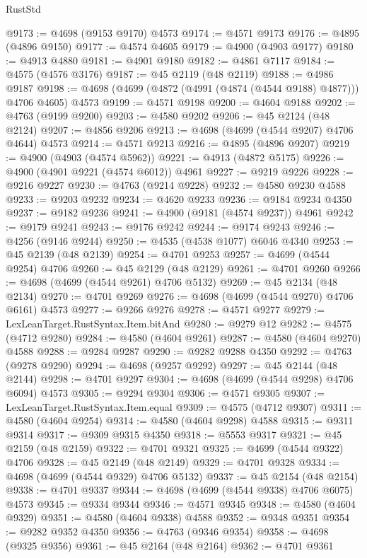 \begin{lexlean}{RustStd}
\begin{coremodule}
@9173 := @4698 (@9153 @9170) @4573
@9174 := @4571 @9173
@9176 := @4895 (@4896 @9150)
@9177 := @4574 @4605
@9179 := @4900 (@4903 @9177)
@9180 := @4913 @4880
@9181 := @4901 @9180
@9182 := @4861 @7117
@9184 := @4575 (@4576 @3176)
@9187 := @45 @2119 (@48 @2119)
@9188 := @4986 @9187
@9198 := @4698 (@4699 (@4872 (@4991 (@4874 (@4544 @9188) @4877))) @4706 @4605) @4573
@9199 := @4571 @9198
@9200 := @4604 @9188
@9202 := @4763 (@9199 @9200)
@9203 := @4580 @9202
@9206 := @45 @2124 (@48 @2124)
@9207 := @4856 @9206
@9213 := @4698 (@4699 (@4544 @9207) @4706 @4644) @4573
@9214 := @4571 @9213
@9216 := @4895 (@4896 @9207)
@9219 := @4900 (@4903 (@4574 @5962))
@9221 := @4913 (@4872 @5175)
@9226 := @4900 (@4901 @9221 (@4574 @6012)) @4961
@9227 := @9219 @9226
@9228 := @9216 @9227
@9230 := @4763 (@9214 @9228)
@9232 := @4580 @9230 @4588
@9233 := @9203 @9232
@9234 := @4620 @9233
@9236 := @9184 @9234 @4350
@9237 := @9182 @9236
@9241 := @4900 (@9181 (@4574 @9237)) @4961
@9242 := @9179 @9241
@9243 := @9176 @9242
@9244 := @9174 @9243
@9246 := @4256 (@9146 @9244)
@9250 := @4535 (@4538 @1077) @6046 @4340
@9253 := @45 @2139 (@48 @2139)
@9254 := @4701 @9253
@9257 := @4699 (@4544 @9254) @4706
@9260 := @45 @2129 (@48 @2129)
@9261 := @4701 @9260
@9266 := @4698 (@4699 (@4544 @9261) @4706 @5132)
@9269 := @45 @2134 (@48 @2134)
@9270 := @4701 @9269
@9276 := @4698 (@4699 (@4544 @9270) @4706 @6161) @4573
@9277 := @9266 @9276
@9278 := @4571 @9277
@9279 := LexLeanTarget.RustSyntax.Item.bitAnd
@9280 := @9279 @12
@9282 := @4575 (@4712 @9280)
@9284 := @4580 (@4604 @9261)
@9287 := @4580 (@4604 @9270) @4588
@9288 := @9284 @9287
@9290 := @9282 @9288 @4350
@9292 := @4763 (@9278 @9290)
@9294 := @4698 (@9257 @9292)
@9297 := @45 @2144 (@48 @2144)
@9298 := @4701 @9297
@9304 := @4698 (@4699 (@4544 @9298) @4706 @6094) @4573
@9305 := @9294 @9304
@9306 := @4571 @9305
@9307 := LexLeanTarget.RustSyntax.Item.equal
@9309 := @4575 (@4712 @9307)
@9311 := @4580 (@4604 @9254)
@9314 := @4580 (@4604 @9298) @4588
@9315 := @9311 @9314
@9317 := @9309 @9315 @4350
@9318 := @5553 @9317
@9321 := @45 @2159 (@48 @2159)
@9322 := @4701 @9321
@9325 := @4699 (@4544 @9322) @4706
@9328 := @45 @2149 (@48 @2149)
@9329 := @4701 @9328
@9334 := @4698 (@4699 (@4544 @9329) @4706 @5132)
@9337 := @45 @2154 (@48 @2154)
@9338 := @4701 @9337
@9344 := @4698 (@4699 (@4544 @9338) @4706 @6075) @4573
@9345 := @9334 @9344
@9346 := @4571 @9345
@9348 := @4580 (@4604 @9329)
@9351 := @4580 (@4604 @9338) @4588
@9352 := @9348 @9351
@9354 := @9282 @9352 @4350
@9356 := @4763 (@9346 @9354)
@9358 := @4698 (@9325 @9356)
@9361 := @45 @2164 (@48 @2164)
@9362 := @4701 @9361

\end{coremodule}
\end{lexlean}
